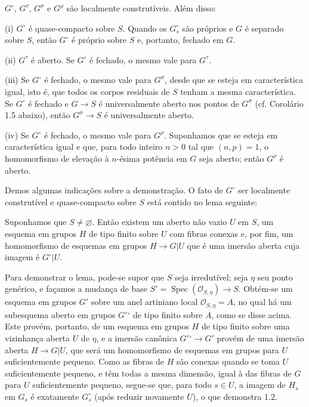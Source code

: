  $G^\circ$, $G^\tau$, $G^\sigma$ e $G^\rho$ são
localmente construtíveis. Além disso:

\noindent (i) $G^\circ$ é quase-compacto sobre $S$. Quando os $G_s^\circ$ são
próprios e $G$ é separado sobre $S$, então $G^\circ$ é próprio sobre $S$ e,
portanto, fechado em $G$.

\noindent (ii) $G^\tau$ é aberto. Se $G^\circ$ é fechado, o mesmo vale para
$G^\tau$.

\noindent (iii) Se $G^\circ$ é fechado, o mesmo vale para $G^\sigma$, desde
que se esteja em característica igual, isto é, que todos os corpos residuais de
$S$ tenham a mesma característica. Se $G^\circ$ é fechado e
$G\longrightarrow S$ é universalmente aberto nos pontos de $G^\sigma$ (cf.
Corolário 1.5 abaixo), então $G^\sigma\longrightarrow S$ é universalmente
aberto.

\noindent (iv) Se $G^\circ$ é fechado, o mesmo vale para $G^\rho$. Suponhamos
que se esteja em característica igual e que, para todo inteiro $n>0$ tal que
$(n,p)=1$, o homomorfismo de elevação à $n$-ésima potência em $G$ seja aberto;
então $G^\rho$ é aberto.

Demos algumas indicações sobre a demonstração. O fato de $G^\circ$ ser
localmente construtível e quase-compacto sobre $S$ está contido no lema
seguinte:

 Suponhamos que $S\neq\varnothing$. Então existem um aberto
não vazio $U$ em $S$, um esquema em grupos $H$ de tipo finito sobre $U$ com
fibras conexas e, por fim, um homomorfismo de esquemas em grupos
$H\longrightarrow G|U$ que é uma imersão aberta cuja imagem é
$G^\circ|U$.

Para demonstrar o lema, pode-se supor que $S$ seja irredutível; seja $\eta$ seu
ponto genérico, e façamos a mudança de base
$S'=\operatorname{Spec}(\mathcal O_{S,\eta})\longrightarrow S$. Obtém-se um
esquema em grupos $G'$ sobre um anel artiniano local
$\mathcal O_{S,\eta}=A$, no qual há um subesquema aberto em grupos
$G'{}^\circ$ de tipo finito sobre $A$, como se disse acima. Este provém,
portanto, de um esquema em grupos $H$ de tipo finito sobre uma vizinhança
aberta $U$ de $\eta$, e a imersão canônica
$G'{}^\circ\longrightarrow G'$ provém de uma imersão
aberta $H\longrightarrow G|U$, que será um homomorfismo de esquemas em grupos
para $U$ suficientemente pequeno. Como as fibras de $H$ são conexas quando se
toma $U$ suficientemente pequeno, e têm todas a mesma dimensão, igual à das
fibras de $G$ para $U$ suficientemente pequeno, segue-se que, para todo
$s\in U$, a imagem de $H_s$ em $G_s$ é exatamente $G_s^\circ$ (após reduzir
novamente $U$), o que demonstra 1.2.

